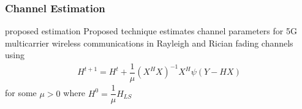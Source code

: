 \documentclass{beamer}
\begin{document}

\begin{frame}
\frametitle{Channel Estimation}
\begin{block}{proposed estimation}
Proposed technique estimates channel parameters for 5G 
multicarrier wireless communications in Rayleigh and Rician 
fading channels using
\begin{align}
    H^{t+1}=H^{t} + \dfrac{1}{\mu} \left( X^{H}X\right)^{-1} X^{H} \psi \left( Y-HX \right)
\end{align}
for some $\mu > 0$ where $H^{0}=\dfrac{1}{\mu} \hat{H}_{LS}$

\end{block}
\end{frame}

\end{document}

